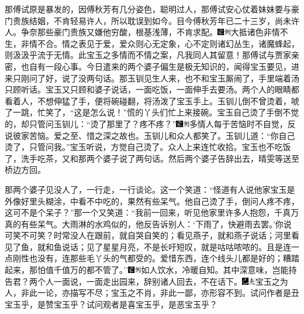 那傅试原是暴发的，因傅秋芳有几分姿色，聪明过人，那傅试安心仗着妹妹要与豪门贵族结姻，不肯轻易许人，所以耽误到如今。目今傅秋芳年已二十三岁，尚未许人。争奈那些豪门贵族又嫌他穷酸，根基浅薄，不肯求配。{\includegraphics[width=3mm]{../Images/00006}\includegraphics[width=3mm]{../Images/00011}\footnotesize \kaishu 大抵诸色非情不生，非情不合。情之表见于爱，爱众则心无定象，心不定则诸幻丛生，诸魔蜂起，则汲汲乎流于无情。此宝玉之多情而不情之案，凡我同人其留意！}那傅试与贾家亲密，也自有一段心事。今日遣来的两个婆子偏生是极无知识的，闻得宝玉要见，进来只刚问了好，说了没两句话。那玉钏见生人来，也不和宝玉厮闹了，手里端着汤只顾听话。宝玉又只顾和婆子说话，一面吃饭，一面伸手去要汤。两个人的眼睛都看着人，不想伸猛了手，便将碗碰翻，将汤泼了宝玉手上。玉钏儿倒不曾烫着，唬了一跳，忙笑了，``这是怎么说！''慌的丫头们忙上来接碗。宝玉自己烫了手倒不觉的，却只管问玉钏儿：``烫了那里了？疼不疼？''{\includegraphics[width=3mm]{../Images/00006}\includegraphics[width=3mm]{../Images/00011}\footnotesize \kaishu 多情人每于苦恼时不自觉，反说彼家苦恼。爱之至、惜之深之故也。}玉钏儿和众人都笑了。玉钏儿道：``你自己烫了，只管问我。''宝玉听说，方觉自己烫了。众人上来连忙收拾。宝玉也不吃饭了，洗手吃茶，又和那两个婆子说了两句话。然后两个婆子告辞出去，晴雯等送至桥边方回。

那两个婆子见没人了，一行走，一行谈论。这一个笑道：``怪道有人说他家宝玉是外像好里头糊涂，中看不中吃的，果然有些呆气。他自己烫了手，倒问人疼不疼，这可不是个呆子？''那一个又笑道：``我前一回来，听见他家里许多人抱怨，千真万真的有些呆气。大雨淋的水鸡似的，他反告诉别人：`下雨了，快避雨去罢。'你说可笑不可笑？时常没人在跟前，就自哭自笑的；看见燕子，就和燕子说话；河里看见了鱼，就和鱼说话；见了星星月亮，不是长吁短叹，就是咕咕哝哝的。且是连一点刚性也没有，连那些毛丫头的气都受的。爱惜东西，连个线头儿都是好的；糟踏起来，那怕值千值万的都不管了。''{\includegraphics[width=3mm]{../Images/00006}\includegraphics[width=3mm]{../Images/00011}\footnotesize \kaishu 如人饮水，冷暖自知。其中深意味，岂能持告君？}两个人一面说，一面走出园来，辞别诸人回去，不在话下。{\includegraphics[width=3mm]{../Images/00003}\includegraphics[width=3mm]{../Images/00012}\footnotesize \kaishu 宝玉之为人，非此一论，亦描写不尽；宝玉之不肖，非此一鄙，亦形容不到。试问作者是丑宝玉乎，是赞宝玉乎？试问观者是喜宝玉乎，是恶宝玉乎？}

